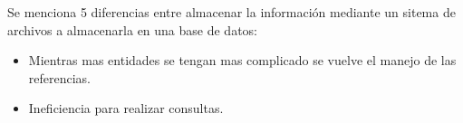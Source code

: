 \documentclass[10pt]{article}
\begin{document}
    
    
    \noindent Se menciona 5 diferencias entre almacenar la información mediante un sitema de archivos a almacenarla en una base de datos:
    
    \begin{itemize}
    	
    	\item Mientras mas entidades se tengan mas complicado se vuelve el manejo de las referencias.
    	\item Ineficiencia para realizar consultas.
    \end{itemize}
    
\end{document}
